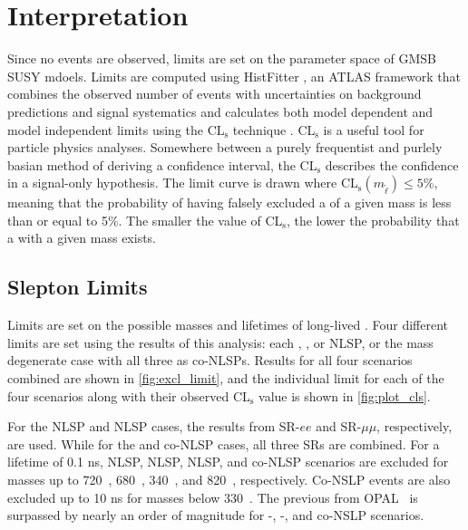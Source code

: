 \chapter{Interpretation}

Since no events are observed, limits are set on the parameter space of \ac{GMSB} \ac{SUSY} mdoels. Limits are computed using HistFitter \cite{histfitter}, an \ac{ATLAS} framework that combines the observed number of events with uncertainties on background predictions and signal systematics and calculates both model dependent and model independent limits using the CL$_{\text{s}}$ technique \cite{CLs-1}. CL$_{\text{s}}$ is a useful tool for particle physics analyses. Somewhere between a purely frequentist and purlely basian method of deriving a confidence interval, the CL$_{\text{s}}$ describes the confidence in a signal-only hypothesis. The limit curve is drawn where CL$_{\text{s}}(m_{\tilde{\ell}}) \leq 5\%$, meaning that the probability of having falsely excluded a \slep of a given mass is less than or equal to 5\%. The smaller the value of CL$_{\text{s}}$, the lower the probability that a \slep with a given mass exists.  

\section{Slepton Limits}
Limits are set on the possible masses and lifetimes of long-lived \slep. Four different limits are set using the results of this analysis: each \selec, \smu, or \stau \ac{NLSP}, or the mass degenerate case with all three as co-\ac{NLSP}s. Results for all four scenarios combined are shown in \autoref{fig:excl_limit}, and the individual limit for each of the four scenarios along with their observed CL$_{\text{s}}$ value is shown in \autoref{fig:plot_cls}.

For the \selec \ac{NLSP} and \smu \ac{NLSP} cases, the results from SR-$ee$ and SR-$\mu\mu$, respectively, are used. While for the \stau and co-\ac{NLSP} cases, all three SRs are combined. For a lifetime of 0.1 ns, \selec NLSP, \smu \ac{NLSP}, \stau \ac{NLSP}, and co-NLSP scenarios are excluded for \slep masses up to 720~\GeV, 680~\GeV, 340~\GeV, and 820~\GeV, respectively. Co-NSLP events are also excluded up to 10 ns for masses below 330~\GeV. The previous from OPAL~\cite{opal} is surpassed by nearly an order of magnitude for \selec-, \smu-, and co-NSLP scenarios.


